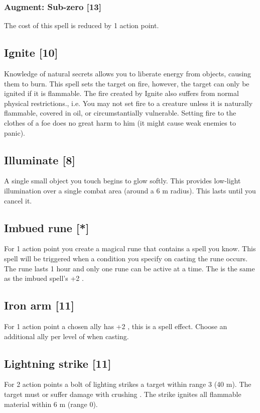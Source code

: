 \subsubsection{Augment: Sub-zero [13]}
The cost of this spell is reduced by 1 action point.


\subsection{Ignite [10]}
\label{spell:ignite}
Knowledge of natural secrets allows you to liberate energy from objects, causing them to burn. This spell sets the target on fire, however, the target can only be ignited if it is flammable. The fire created by Ignite also suffers from normal physical restrictions., i.e. You may not set fire to a creature unless it is naturally flammable, covered in oil, or circumstantially vulnerable. Setting fire to the clothes of a foe does no great harm to him (it might cause weak enemies to panic).


\subsection{Illuminate [8]}
\label{spell:illuminate}
A single small object you touch begins to glow softly. This provides low-light illumination over a single combat area (around a 6 m radius). This lasts until you cancel it.


\subsection{Imbued rune [*]}
For 1 action point you create a magical rune that contains a spell you know. This spell will be triggered when a condition you specify on casting the rune occurs. The rune lasts 1 hour and only one rune can be active at a time. The  is the same as the imbued spell's +2 .


\subsection{Iron arm [11]}
For 1 action point a chosen ally has +2 , this is a  spell effect. Choose an additional ally per level of  when casting.


\subsection{Lightning strike [11]}
For 2 action points a bolt of lighting strikes a target within range 3 (40 m). The target must  or suffer damage with crushing . The strike ignites all flammable material within 6 m (range 0).

